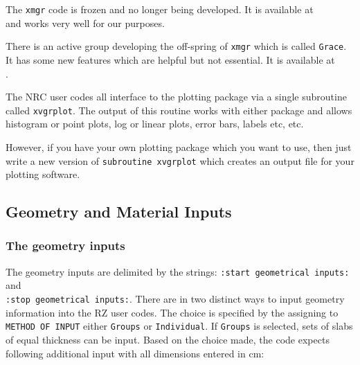 \documentclass[12pt,twoside]{article}  %
\begin{document}
The {\tt xmgr} code is frozen and no longer being developed. It is
available at\\ 
and works very well for our purposes.

There is an active group developing the off-spring of {\tt xmgr} which is
called {\tt Grace}. It has some new features which are helpful but not
essential. It is available at\\ .

The NRC user codes all interface to the plotting package via a single
subroutine called {\tt xvgrplot}. The output of this routine works with either
package and allows histogram or point plots, log or linear plots, error
bars, labels etc, etc.

However, if you have your own plotting package which you want to use, then
just write a new version of {\tt subroutine xvgrplot} which creates an
output file for your plotting software.

\subsection{Geometry and Material Inputs}

\subsubsection{The geometry inputs}
\label{geomsect}

 
The geometry inputs are delimited by the strings:
\verb+:start geometrical inputs:+ and \\
\verb+:stop geometrical inputs:+.
There are in two distinct ways to input geometry information into the RZ
user codes. The choice is specified by the assigning to \verb+METHOD OF INPUT+
either \verb+Groups+ or \verb+Individual+. If \verb+Groups+
is selected, sets of slabs of equal thickness can be input. 
Based on the choice made, the code expects following additional input
with all dimensions entered in cm:
\end{document}

